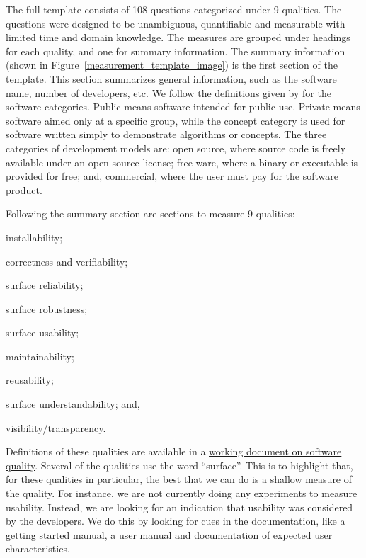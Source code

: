 \documentclass[letterpaper,cleveref]{lipics-v2019}
\begin{document}
The full template consists of 108 questions categorized under 9 qualities.  The
questions were designed to be unambiguous, quantifiable and measurable with
limited time and domain knowledge. The measures are grouped under headings for
each quality, and one for summary information. The summary information (shown in
Figure~\ref{measurement_template_image}) is the first section of the template.
This section summarizes general information, such as the software name, number
of developers, etc.  We follow the definitions given by
\citet{GewaltigAndCannon2012} for the software categories.  Public means software
intended for public use.  Private means software aimed only at a specific
group, while the concept category is used for software written simply to demonstrate
algorithms or concepts. The three categories of development models are: open
source, where source code is freely available under an open source license;
free-ware, where a binary or executable is provided for free; and, commercial,
where the user must pay for the software product.  

Following the summary section are sections to measure 9 qualities: 
\begin{inparaenum}
	\item installability;
	\item correctness and verifiability;
	\item surface reliability;
	\item surface robustness;
	\item surface usability;
	\item maintainability;
	\item reusability;
	\item surface understandability; and,
	\item visibility/transparency. 
\end{inparaenum} 
Definitions of these qualities are available in a
\href{https://github.com/smiths/AIMSS/blob/master/StateOfPractice/QDefOfQualities/QDefOfQualities.pdf}{working
document on software quality}.  Several of the qualities use the word
``surface''.  This is to highlight that, for these qualities in particular, the
best that we can do is a shallow measure of the quality.  For instance, we are
not currently doing any experiments to measure usability.  Instead, we are
looking for an indication that usability was considered by the developers.  We
do this by looking for cues in the documentation, like a getting started manual,
a user manual and documentation of expected user characteristics.
\end{document}

